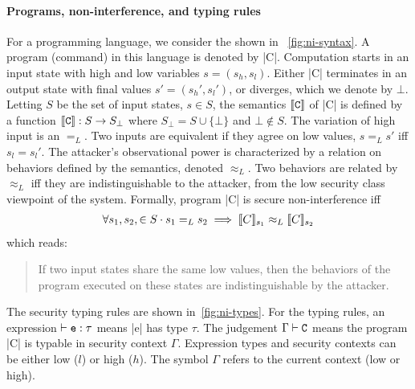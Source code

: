 \paragraph*{Programs, non-interference, and typing rules}
For a programming language, we consider the  shown in
~\autoref{fig:ni-syntax}. A program (command) in this language is denoted by
\pr|C|. Computation starts in an input state with high and low
variables \(s = (s_h, s_l)\). Either
\pr|C| terminates in an output state with final values \(s' = (s_h',
s_l')\), or diverges, which we denote by
\(\bot\). Letting \(S\) be the set of input states,
\(s \in S \), the semantics \(\sem{\text{\pr|C|}}\)
of \pr|C| is defined by a function \(\sem{\text{\pr|C|}} : S
\rightarrow S_\bot \) where \( S_\bot
= S \cup \{ \bot \} \) and \( \bot \notin S\). The
variation of high input is an  \(=_L\). Two
inputs are equivalent if they agree on low values, \ie \(s =_L
s'\) iff \( s_l = s_l'
\). The attacker's
observational power is characterized by a relation on behaviors defined by the
semantics, denoted \(\approx_L\). Two behaviors are related by
\(\approx_L\) iff they are
indistinguishable to the attacker, \ie from the low security class viewpoint of the system. Formally,
program \pr|C| is secure \wrt non-interference iff
\begin{align*}
\forall s_1,s_2,\in S \cdot s_1 =_L s_2\implies\llbracket C\rrbracket_{s_1}\approx_L\llbracket C\rrbracket_{s_2}
\end{align*}
which reads:
\begin{quotation}
\noindent If two input states share the same low values, then the behaviors of
the program executed on these states are indistinguishable by the
attacker.
\end{quotation}
The security typing rules are shown in~\autoref{fig:ni-types}. For the typing
rules, an expression \(\vdash\prm{e} : \tau\) means
\pr|e| has type \(\tau\). The judgement
\(\Gamma\vdash\text{\pr|C|}\) means the program
\pr|C| is typable in security context \({\Gamma}\).
Expression types and security contexts can be either low (\({l}\)) or
high (\({h}\)). The symbol \(\Gamma\) refers to the current
context (low or high).


